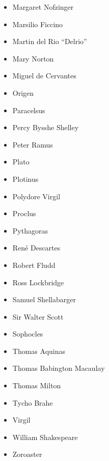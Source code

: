 \documentclass[12pt]{article}
\begin{document}
\begin{itemize}
\item
  Margaret Nofzinger
\item
  Marsilio Ficcino
\item
  Martin del Rio ``Delrio''
\item
  Mary Norton
\item
  Miguel de Cervantes
\item
  Origen
\item
  Paracelsus
\item
  Percy Bysshe Shelley
\item
  Peter Ramus
\item
  Plato
\item
  Plotinus
\item
  Polydore Virgil
\item
  Proclus
\item
  Pythagoras
\item
  René Descartes
\item
  Robert Fludd
\item
  Ross Lockbridge
\item
  Samuel Shellabarger
\item
  Sir Walter Scott
\item
  Sophocles
\item
  Thomas Aquinas
\item
  Thomas Babington Macaulay
\item
  Thomas Milton
\item
  Tycho Brahe
\item
  Virgil
\item
  William Shakespeare
\item
  Zoroaster
\end{itemize}

\end{document}
